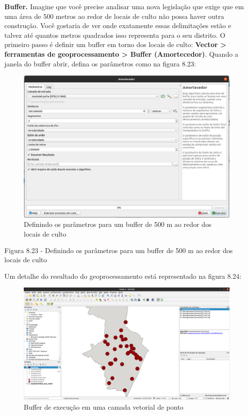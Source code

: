 \documentclass[
]{krantz}
\begin{document}
\textbf{Buffer.} Imagine que você precise analisar uma nova legislação que exige que em uma área de 500 metros ao redor de locais de culto não possa haver outra construção. Você gostaria de ver onde exatamente essas delimitações estão e talvez até quantos metros quadrados isso representa para o seu distrito. O primeiro passo é definir um buffer em torno dos locais de culto: \textbf{Vector \textgreater{} ferramentas de geoprocessamento \textgreater{} Buffer (Amortecedor)}. Quando a janela do buffer abrir, defina os parâmetros como na figura 8.23:

\begin{figure}
\centering
\includegraphics{media/modulo8/fig823.png}
\caption{Definindo os parâmetros para um buffer de 500 m ao redor dos locais de culto}
\end{figure}

Figura 8.23 \hspace{0pt}\hspace{0pt}- Definindo os parâmetros para um buffer de 500 m ao redor dos locais de culto

Um detalhe do resultado do geoprocessamento está representado na figura 8.24:

\begin{figure}
\centering
\includegraphics{media/modulo8/fig824.png}
\caption{Buffer de execução em uma camada vetorial de ponto}
\end{figure}
\end{document}
